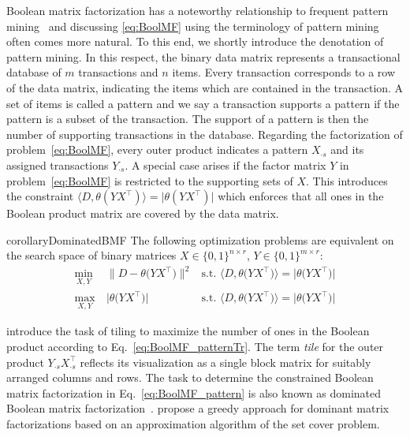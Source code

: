 Boolean matrix factorization has a noteworthy relationship to frequent pattern mining~\citep{aggarwal2014frequent} and discussing \ref{eq:BoolMF} using the terminology of pattern mining often comes more natural. To this end, we shortly introduce the denotation of pattern mining. In this respect, the binary data matrix represents a transactional database of $m$ transactions and $n$ items. Every transaction corresponds to a row of the data matrix, indicating the items which are contained in the transaction. A set of items is called a pattern and we say a transaction supports a pattern if the pattern is a subset of the transaction. The support of a pattern is then the number of supporting transactions in the database. Regarding the factorization of problem~\eqref{eq:BoolMF}, every outer product indicates a pattern $X_{\cdot s}$ and its assigned transactions $Y_{\cdot s}$. 
A special case arises if the factor matrix $Y$ in problem~\eqref{eq:BoolMF} is restricted to the supporting sets of $X$.  This introduces the constraint $\langle D,\theta(YX^\top)\rangle=\lvert \theta(YX^\top)\rvert $ which enforces that all ones in the Boolean product matrix are covered by the data matrix. 
\begin{restatable}{corollary}{DominatedBMF}\label{thm:dominatedBMF}
The following optimization problems are equivalent on the search space of binary matrices
$X\in\{0,1\}^{n\times r}$, $Y\in\{0,1\}^{m\times r}$:
\begin{align}
    \label{eq:BoolMF_pattern}
    \min_{X,Y}&\ \bigl\lVert D-\theta\bigl(YX^\top\bigr)\bigr\rVert ^2 & \text{s.t. } \bigl\langle D,\theta\bigl(YX^\top\bigr)\bigr\rangle = \bigl\lvert \theta\bigl(YX^\top\bigr)\bigr\rvert\\
    \label{eq:BoolMF_patternTr}
    \max_{X,Y}&\ \bigl\lvert \theta\bigl(YX^\top\bigr)\bigr\rvert & \text{s.t. } \bigl\langle D,\theta\bigl(YX^\top\bigr)\bigr\rangle = \bigl\lvert \theta\bigl(YX^\top\bigr)\bigr\rvert %
\end{align}
\end{restatable}
\cite{geerts2004tiling} introduce the task of tiling to maximize the number of ones in the Boolean product according to Eq.~\eqref{eq:BoolMF_patternTr}. The term \emph{tile} for the outer product $Y_{\cdot s}X_{\cdot s}^\top$ reflects its visualization as a single block matrix for suitably arranged columns and rows. The task to determine the constrained Boolean matrix factorization in Eq.~\eqref{eq:BoolMF_pattern} is also known as dominated Boolean matrix factorization~\citep{miettinen2010sparse}. \cite{belohlavek2010discovery,belohlavek2015below} propose a greedy approach for dominant matrix factorizations based on an approximation algorithm of the set cover problem. 
